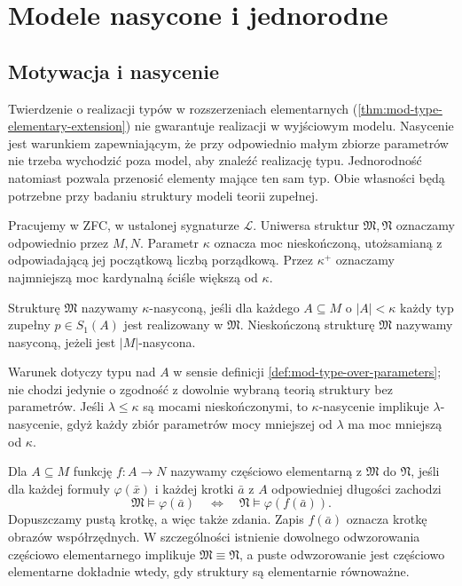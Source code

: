 \chapter{Modele nasycone i jednorodne}
\label{ch:mod-saturation}
\section{Motywacja i nasycenie}
Twierdzenie o realizacji typów w rozszerzeniach elementarnych
(\ref{thm:mod-type-elementary-extension}) nie gwarantuje
realizacji w wyjściowym modelu. Nasycenie jest warunkiem
zapewniającym, że przy odpowiednio małym zbiorze parametrów
nie trzeba wychodzić poza model, aby znaleźć realizację typu.
Jednorodność natomiast pozwala przenosić elementy mające
ten sam typ. Obie własności będą potrzebne przy badaniu
struktury modeli teorii zupełnej.

Pracujemy w ZFC, w ustalonej sygnaturze $\mathcal L$.
Uniwersa struktur $\mathfrak M,\mathfrak N$ oznaczamy
odpowiednio przez $M,N$. Parametr $\kappa$ oznacza moc nieskończoną, utożsamianą
z odpowiadającą jej początkową liczbą porządkową.
Przez $\kappa^+$ oznaczamy najmniejszą moc kardynalną
ściśle większą od $\kappa$.

\begin{definicja}[Nasycenie]
\label{def:mod-saturation}
Strukturę $\mathfrak M$ nazywamy $\kappa$-nasyconą, jeśli
dla każdego $A\subseteq M$ o $|A|<\kappa$ każdy typ
zupełny $p\in S_1(A)$ jest realizowany w $\mathfrak M$.
Nieskończoną strukturę $\mathfrak M$ nazywamy nasyconą,
jeżeli jest $|M|$-nasycona.
\end{definicja}

Warunek dotyczy typu nad $A$ w sensie definicji
\ref{def:mod-type-over-parameters}; nie chodzi jedynie
o zgodność z dowolnie wybraną teorią struktury bez parametrów.
Jeśli $\lambda\leq\kappa$ są mocami nieskończonymi,
to $\kappa$-nasycenie implikuje $\lambda$-nasycenie,
gdyż każdy zbiór parametrów mocy mniejszej od $\lambda$
ma moc mniejszą od $\kappa$.

\begin{definicja}
\label{def:mod-partial-elementary}
Dla $A\subseteq M$ funkcję $f:A\to N$ nazywamy
częściowo elementarną z $\mathfrak M$ do $\mathfrak N$,
jeśli dla każdej formuły $\varphi(\bar x)$ i każdej
krotki $\bar a$ z $A$ odpowiedniej długości zachodzi
\[
\mathfrak M\models\varphi(\bar a)
\quad\Longleftrightarrow\quad
\mathfrak N\models\varphi(f(\bar a)).
\]
Dopuszczamy pustą krotkę, a więc także zdania.
Zapis $f(\bar a)$ oznacza krotkę obrazów współrzędnych.
W szczególności istnienie dowolnego odwzorowania częściowo
elementarnego implikuje $\mathfrak M\equiv\mathfrak N$,
a puste odwzorowanie jest częściowo elementarne dokładnie
wtedy, gdy struktury są elementarnie równoważne.
\end{definicja}

